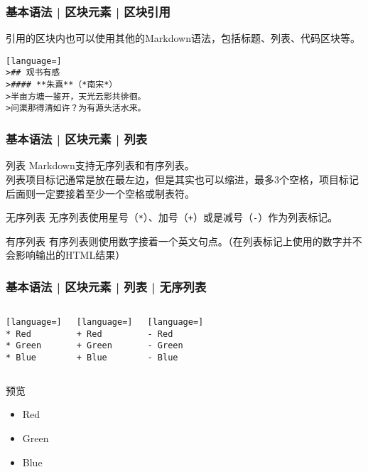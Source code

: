 \begin{frame}[fragile]
  \frametitle{基本语法 | 区块元素 | 区块引用}
  引用的区块内也可以使用其他的Markdown语法，包括标题、列表、代码区块等。
\begin{lstlisting}[language=]
>## 观书有感
>#### **朱熹**（*南宋*）
>半亩方塘一鉴开，天光云影共徘徊。
>问渠那得清如许？为有源头活水来。
\end{lstlisting}
\end{frame}

\begin{frame}[fragile]
  \frametitle{基本语法 | 区块元素 | \alert{列表}}
  \begin{block}{列表}
    Markdown支持无序列表和有序列表。\\
    \vspace{1em}
 列表项目标记通常是放在最左边，但是其实也可以缩进，最多3个空格，项目标记后面则一定要接着至少一个空格或制表符。
  \end{block}
  \pause
  \begin{block}{无序列表}
    无序列表使用星号（\verb|*|）、加号（\verb|+|）或是减号（\verb|-|）作为列表标记。
  \end{block}
  \pause
  \begin{block}{有序列表}
    有序列表则使用数字接着一个英文句点。（在列表标记上使用的数字并不会影响输出的HTML结果）
  \end{block}
\end{frame}

\begin{frame}[fragile]
  \frametitle{基本语法 | 区块元素 | 列表 | \alert{无序列表}}
  \begin{columns}
\begin{lstlisting}[language=]
* Red
* Green
* Blue
\end{lstlisting}
\begin{lstlisting}[language=]
+ Red
+ Green
+ Blue
\end{lstlisting}
\begin{lstlisting}[language=]
- Red
- Green
- Blue
\end{lstlisting}
  \end{columns}
  \begin{columns}
  \begin{block}{预览}
    \begin{itemize}
      \item Red
      \item Green
      \item Blue
    \end{itemize}
  \end{block}
  \end{columns}
\end{frame}

